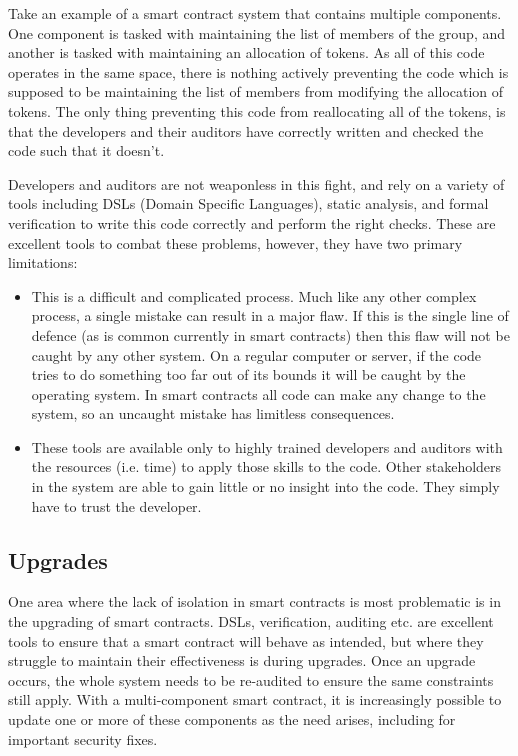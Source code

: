 \documentclass[english,a4paper]{article}
\begin{document}
Take an example of a smart contract system that contains multiple components.
One component is tasked with maintaining the list of members of the group, and
another is
tasked with maintaining an allocation of tokens. As all of this code operates in
the same space, there is nothing actively preventing the code which is supposed
to be maintaining the list of members from modifying the allocation of tokens.
The only thing preventing this code from reallocating all of the tokens, is that
the developers and their auditors have correctly written and checked the code
such that it doesn't.

Developers and auditors are not weaponless in this fight, and rely on a variety
of tools including DSLs (Domain Specific Languages), static analysis, and formal
verification to write this code correctly and perform the right checks. These
are excellent tools to combat these problems, however, they have
two primary limitations:

\begin{itemize}
  \item This is a difficult and complicated process. Much like any other complex
  process, a single mistake can result in a major flaw. If this is the single
  line of defence (as is common currently in smart contracts) then this flaw
  will not be caught by any other system.
  On a regular computer or server, if the code tries to do
  something too far out of its bounds it will be caught by the operating system.
  In smart
  contracts all code can make any change to the system, so an uncaught mistake
  has limitless consequences.
  \item These tools are available only to highly trained developers and auditors
  with the resources (i.e. time) to apply those skills to the code. Other
  stakeholders in the system are able to gain little or no insight into the
  code. They simply have to trust the developer.
\end{itemize}

\subsection{Upgrades}\label{upgrades}
One area where the lack of isolation in smart contracts is most problematic is
in the upgrading of smart contracts. DSLs, verification, auditing etc. are
excellent tools to ensure that a smart contract will behave as intended, but
where they struggle to maintain their effectiveness is during upgrades. Once an
upgrade occurs, the whole system needs to be re-audited to ensure the same
constraints still apply.
With a multi-component smart contract, it is increasingly possible to update one
or more of these components as the need arises, including for important security
fixes.
\end{document}

